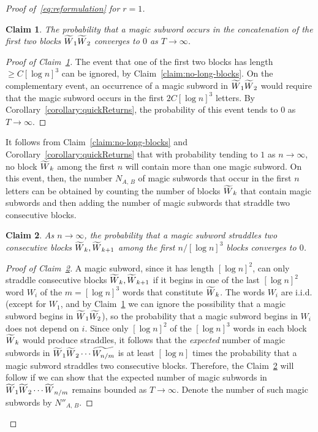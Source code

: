 \documentclass[AHL, Unicode, longabstracts, published]{cedram}
\newtheorem{claim}{Claim}}
\let\oldtilde\tilde
\renewcommand*{\tilde}[1]{\mathchoice{\widetilde{#1}}{\widetilde{#1}}{\oldtilde{#1}}{\oldtilde{#1}}}\let\oldforall\forall
\renewcommand*{\forall}{\mathrel{\oldforall}}
\begin{document}
\begin{proof}[Proof of~\eqref{eq:reformulation} for $r= 1$]
\begin{claim}\label{claim:first-block}
The probability that a magic subword occurs in the concatenation of the first two blocks $\tilde{W}_{1}\tilde{W}_{2}$ converges to $0$ as $T \rightarrow \infty$.
\end{claim}

\begin{proof}[Proof of Claim~\ref{claim:first-block}]
The event that one of the first two blocks has length\linebreak$\geq C[\log n]^{3}$ can be ignored, by Claim~\ref{claim:no-long-blocks}. On the complementary event, an occurrence of a magic subword in $\tilde{W}_{1}\tilde{W}_{2}$ would require that the magic subword occurs in the first $2C[\log n]^{3}$ letters. By Corollary~\ref{corollary:quickReturns}, the probability of this event tends to $0$ as $T \rightarrow \infty$.
\end{proof}



It follows from Claim~\ref{claim:no-long-blocks} and Corollary~\ref{corollary:quickReturns} that with probability tending to $1$ as $n \rightarrow \infty$, no block $\tilde{W}_{k}$ among the first $n$ will contain more than one magic subword. On this event, then, the number $N_{A,\,B}$ of magic subwords that occur in the first $n$ letters can be obtained by counting the number of blocks $\tilde{W}_{k}$ that contain magic subwords and then adding the number of magic subwords that straddle two consecutive blocks.


\begin{claim}\label{claim:no-straddles}
As $n \rightarrow \infty$, the probability that a magic subword straddles two consecutive blocks $\tilde{W}_{k},\tilde{W}_{k+1}$ among the first $n/[\log n]^{3}$ blocks converges to $0$.
\end{claim}

\begin{proof}[Proof of Claim~\ref{claim:no-straddles}]
A magic subword, since it has length $[\log n]^{2}$, can only straddle consecutive blocks $\tilde{W}_{k},\tilde{W}_{k+1}$ if it begins in one of the last $[\log n]^{2}$ word $W_{i}$ of the $m=[\log n]^{3}$ words that constitute $\tilde{W}_{k}$. The words $W_{i}$ are i.i.d. (except for $W_{1}$, and by Claim~\ref{claim:first-block} we can ignore the possibility that a magic subword begins in $\tilde{W}_{1}\tilde{W_{2}}$), so the probability that a magic subword begins in $W_{i}$ does not depend on $i$. Since only $[\log n]^{2}$ of the $[\log n]^{3}$ words in each block $\tilde{W}_{k}$ would produce straddles, it follows that the \emph{expected} number of magic subwords in $\tilde{W}_{1}\tilde{W}_{2}\dotsb \tilde{W_{n/m}}$ is at least $[\log n]$ times the probability that a magic subword straddles two consecutive blocks. Therefore, the Claim~\ref{claim:no-straddles} will follow if we can show that the expected number of magic subwords in $\tilde{W}_{1}\tilde{W}_{2}\dotsb \tilde{W}_{n/m}$ remains bounded as $T \rightarrow \infty$. Denote the number of such magic subwords by $N''_{A,\,B}$.


\end{proof}
\end{proof}
\end{document}
